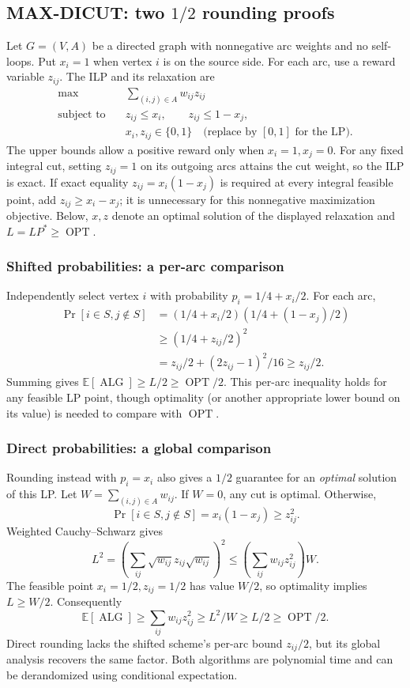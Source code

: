 \documentclass[10pt]{article}
\theoremstyle{definition}
\newcommand{\OPT}{\operatorname{OPT}}
\newcommand{\ALG}{\operatorname{ALG}}
\begin{document}
\subsection{MAX-DICUT: two $1/2$ rounding proofs}\label{lp:dicut}
Let $G=(V,A)$ be a directed graph with nonnegative arc weights and no
self-loops. Put $x_i=1$ when vertex $i$ is on the source side. For each arc,
use a reward variable $z_{ij}$. The ILP and its relaxation are
\[
  \begin{aligned}
    \max\quad&\sum_{(i,j)\in A}w_{ij}z_{ij}\\
    \text{subject to}\quad&z_{ij}\le x_i,\qquad z_{ij}\le1-x_j,\\
    &x_i,z_{ij}\in\{0,1\}\quad
       \text{(replace by }[0,1]\text{ for the LP).}
  \end{aligned}
\]
The upper bounds allow a positive reward only when $x_i=1,x_j=0$.
For any fixed integral cut, setting $z_{ij}=1$ on its outgoing arcs attains
the cut weight, so the ILP is exact. If exact equality
$z_{ij}=x_i(1-x_j)$ is required at every integral feasible point, add
$z_{ij}\ge x_i-x_j$; it is unnecessary for this nonnegative maximization
objective. Below, $x,z$ denote an optimal solution of the displayed
relaxation and $L=LP^*\ge\OPT$.

\subsubsection*{Shifted probabilities: a per-arc comparison}
Independently select vertex $i$ with probability $p_i=1/4+x_i/2$.
For each arc,
\[
  \begin{aligned}
    \Pr[i\in S,j\notin S]
      &=(1/4+x_i/2)(1/4+(1-x_j)/2)\\
      &\ge(1/4+z_{ij}/2)^2\\
      &=z_{ij}/2+(2z_{ij}-1)^2/16\ge z_{ij}/2.
  \end{aligned}
\]
Summing gives $\mathbb E[\ALG]\ge L/2\ge\OPT/2$.
This per-arc inequality holds for any feasible LP point, though optimality
(or another appropriate lower bound on its value) is needed to compare
with $\OPT$.

\subsubsection*{Direct probabilities: a global comparison}
Rounding instead with $p_i=x_i$ also gives a $1/2$ guarantee for an
\emph{optimal} solution of this LP. Let $W=\sum_{(i,j)\in A}w_{ij}$.
If $W=0$, any cut is optimal. Otherwise,
\[
  \Pr[i\in S,j\notin S]=x_i(1-x_j)\ge z_{ij}^2.
\]
Weighted Cauchy--Schwarz gives
\[
  L^2=\left(\sum_{ij}\sqrt{w_{ij}}z_{ij}\sqrt{w_{ij}}\right)^2
    \le\left(\sum_{ij}w_{ij}z_{ij}^2\right)W.
\]
The feasible point $x_i=1/2,z_{ij}=1/2$ has value $W/2$, so optimality
implies $L\ge W/2$. Consequently
\[
  \mathbb E[\ALG]\ge\sum_{ij}w_{ij}z_{ij}^2
    \ge L^2/W\ge L/2\ge\OPT/2.
\]
Direct rounding lacks the shifted scheme's per-arc bound $z_{ij}/2$,
but its global analysis recovers the same factor. Both algorithms are
polynomial time and can be derandomized using conditional expectation.
\end{document}
